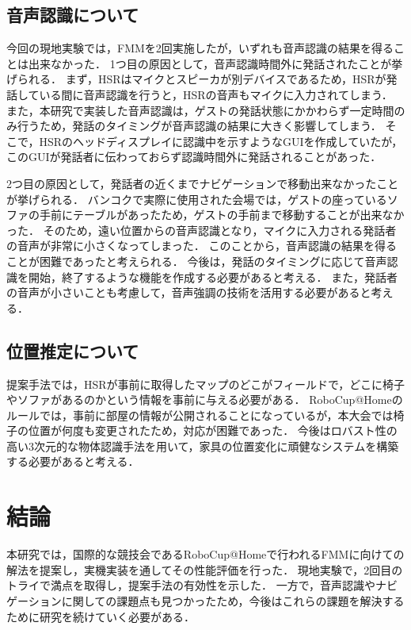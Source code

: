 \documentclass[a4j]{jarticle}
\begin{document}
\subsection{音声認識について}
今回の現地実験では，FMMを2回実施したが，いずれも音声認識の結果を得ることは出来なかった．
1つ目の原因として，音声認識時間外に発話されたことが挙げられる．
まず，HSRはマイクとスピーカが別デバイスであるため，HSRが発話している間に音声認識を行うと，HSRの音声もマイクに入力されてしまう．
また，本研究で実装した音声認識は，ゲストの発話状態にかかわらず一定時間のみ行うため，発話のタイミングが音声認識の結果に大きく影響してしまう．
そこで，HSRのヘッドディスプレイに認識中を示すようなGUIを作成していたが，このGUIが発話者に伝わっておらず認識時間外に発話されることがあった．

2つ目の原因として，発話者の近くまでナビゲーションで移動出来なかったことが挙げられる．
バンコクで実際に使用された会場では，ゲストの座っているソファの手前にテーブルがあったため，ゲストの手前まで移動することが出来なかった．
そのため，遠い位置からの音声認識となり，マイクに入力される発話者の音声が非常に小さくなってしまった．
このことから，音声認識の結果を得ることが困難であったと考えられる．
今後は，発話のタイミングに応じて音声認識を開始，終了するような機能を作成する必要があると考える．
また，発話者の音声が小さいことも考慮して，音声強調\cite{voice_enhancement_1, voice_enhancement_2}の技術を活用する必要があると考える．

\subsection{位置推定について}
提案手法では，HSRが事前に取得したマップのどこがフィールドで，どこに椅子やソファがあるのかという情報を事前に与える必要がある．
RoboCup@Homeのルールでは，事前に部屋の情報が公開されることになっているが，本大会では椅子の位置が何度も変更されたため，対応が困難であった．
今後はロバスト性の高い3次元的な物体認識手法\cite{omni3d, sun2022onepose}を用いて，家具の位置変化に頑健なシステムを構築する必要があると考える．


\section{結論}
本研究では，国際的な競技会であるRoboCup@Homeで行われるFMMに向けての解法を提案し，実機実装を通してその性能評価を行った．
現地実験で，2回目のトライで満点を取得し，提案手法の有効性を示した．
一方で，音声認識やナビゲーションに関しての課題点も見つかったため，今後はこれらの課題を解決するために研究を続けていく必要がある．
\end{document}
